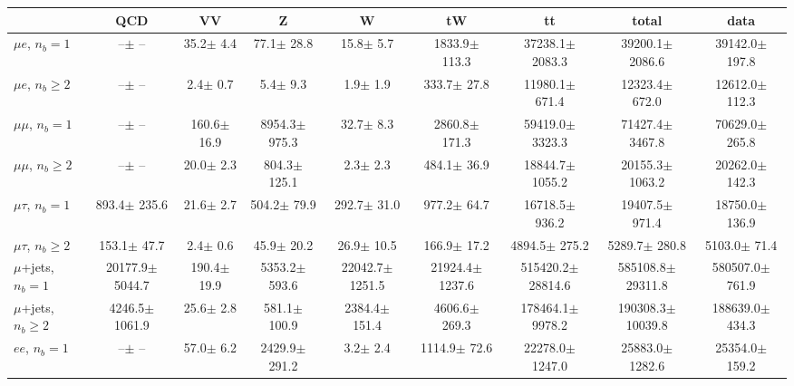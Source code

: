 \begin{sidewaystable}[p]
    \centering
    \setlength{\tabcolsep}{0.4em}
    \renewcommand{\arraystretch}{2}
    \small
    \begin{tabular}{l|cccccc|cc}
    \hline
        & QCD & VV  & Z & W & tW & tt & total & data      \\
    \hline
    
    $\mu e$, $n_b=1$                   &       --$\pm$     -- &     35.2$\pm$    4.4 &     77.1$\pm$   28.8 &     15.8$\pm$    5.7 &   1833.9$\pm$  113.3 &  37238.1$\pm$ 2083.3 &  39200.1$\pm$ 2086.6 &  39142.0$\pm$  197.8 \\ 
    $\mu e$, $n_b\geq2$                &       --$\pm$     -- &      2.4$\pm$    0.7 &      5.4$\pm$    9.3 &      1.9$\pm$    1.9 &    333.7$\pm$   27.8 &  11980.1$\pm$  671.4 &  12323.4$\pm$  672.0 &  12612.0$\pm$  112.3 \\ 
    \hline
    $\mu\mu$, $n_b=1$                  &       --$\pm$     -- &    160.6$\pm$   16.9 &   8954.3$\pm$  975.3 &     32.7$\pm$    8.3 &   2860.8$\pm$  171.3 &  59419.0$\pm$ 3323.3 &  71427.4$\pm$ 3467.8 &  70629.0$\pm$  265.8 \\ 
    $\mu\mu$, $n_b\geq2$               &       --$\pm$     -- &     20.0$\pm$    2.3 &    804.3$\pm$  125.1 &      2.3$\pm$    2.3 &    484.1$\pm$   36.9 &  18844.7$\pm$ 1055.2 &  20155.3$\pm$ 1063.2 &  20262.0$\pm$  142.3 \\ 
    \hline
    $\mu\tau$, $n_b=1$                 &    893.4$\pm$  235.6 &     21.6$\pm$    2.7 &    504.2$\pm$   79.9 &    292.7$\pm$   31.0 &    977.2$\pm$   64.7 &  16718.5$\pm$  936.2 &  19407.5$\pm$  971.4 &  18750.0$\pm$  136.9 \\ 
    $\mu\tau$, $n_b\geq2$              &    153.1$\pm$   47.7 &      2.4$\pm$    0.6 &     45.9$\pm$   20.2 &     26.9$\pm$   10.5 &    166.9$\pm$   17.2 &   4894.5$\pm$  275.2 &   5289.7$\pm$  280.8 &   5103.0$\pm$   71.4 \\ 
    \hline
    $\mu$+jets, $n_b=1$                &  20177.9$\pm$ 5044.7 &    190.4$\pm$   19.9 &   5353.2$\pm$  593.6 &  22042.7$\pm$ 1251.5 &  21924.4$\pm$ 1237.6 & 515420.2$\pm$28814.6 & 585108.8$\pm$29311.8 & 580507.0$\pm$  761.9 \\ 
    $\mu$+jets, $n_b\geq2$             &   4246.5$\pm$ 1061.9 &     25.6$\pm$    2.8 &    581.1$\pm$  100.9 &   2384.4$\pm$  151.4 &   4606.6$\pm$  269.3 & 178464.1$\pm$ 9978.2 & 190308.3$\pm$10039.8 & 188639.0$\pm$  434.3 \\ 
    \hline
    $e e$, $n_b=1$                     &       --$\pm$     -- &     57.0$\pm$    6.2 &   2429.9$\pm$  291.2 &      3.2$\pm$    2.4 &   1114.9$\pm$   72.6 &  22278.0$\pm$ 1247.0 &  25883.0$\pm$ 1282.6 &  25354.0$\pm$  159.2 \\ 

\end{tabular}
\end{sidewaystable}
